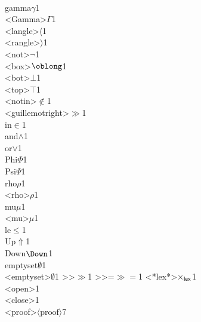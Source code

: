 {  {\\gamma}{{$\gamma$}}1
  {\\<Gamma>}{{$\Gamma$}}1
  {\\<langle>}{{$\langle$}}1
  {\\<rangle>}{{$\rangle$}}1
  {\\<not>}{{$\neg$}}1
  {\\<box>}{{$\oblong$}}1
  {\\<bot>}{{$\bot$}}1
  {\\<top>}{{$\top$}}1
  {\\<notin>}{{$\notin$}}1
  {\\<guillemotright>}{{$\gg$}}1
  {\\in}{$\in$}1
  {\\and}{$\wedge$}1
  {\\or}{$\vee$}1
  {\\Phi}{{$\Phi$}}1
  {\\Psi}{{$\Psi$}}1
  {\\rho}{{$\rho$}}1
  {\\<rho>}{{$\rho$}}1
  {\\mu}{{$\mu$}}1
  {\\<mu>}{{$\mu$}}1
  {\\le}{{$\le$}}1
  {\\Up}{{$\Uparrow$}}1
  {\\Down}{{$\Down$}}1
  {\\emptyset}{{$\emptyset$}}1
  {\\<emptyset>}{{$\emptyset$}}1
  {>>}{{$\gg$}}1
  {>>=}{{${\gg}{=}$}}1
  {<*lex*>}{{$\times_{\sf lex}$}}1
  {\\<open>}{{\rm\guilsinglleft}}1
  {\\<close>}{{\rm\guilsinglright}}1
  {\\<proof>}{{\color{darkgray}$\langle\text{proof}\rangle$}}7
}

\newcommand*{\rightcomment}[1]{\hfill\color{darkgray} --- #1}%

\newcommand{\is}{\lstinline[language=isabelle]}
\newcommand{\q}[1]{\mbox{\guilsinglleft{#1}\hspace{-.0pt}\guilsinglright}}
\cMakeRobust\q

